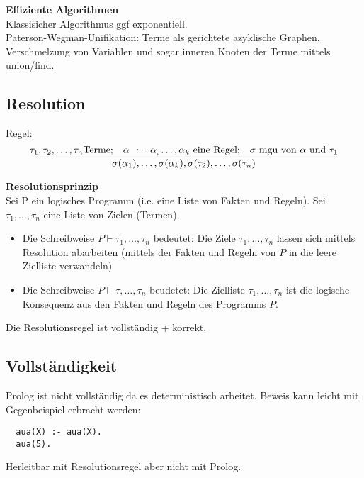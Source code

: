\textbf{Effiziente Algorithmen}\\
Klassisicher Algorithmus ggf exponentiell.\\
Paterson-Wegman-Unifikation: Terme als gerichtete azyklische Graphen.
Verschmelzung von Variablen und sogar inneren Knoten der Terme mittels union/find.

\subsection{Resolution}
Regel:
\[\frac{\tau_1, \tau_2, \ldots, \tau_n \text{Terme;}\quad \alpha \texttt{ :- } \alpha_, \ldots, \alpha_k \text{ eine Regel;}\quad \sigma \text{ mgu von } \alpha \text{ und } \tau_1}
  {\sigma(\alpha_1), \ldots, \sigma(\alpha_k), \sigma(\tau_2), \ldots, \sigma(\tau_n)}\]

\textbf{Resolutionsprinzip}\\
Sei P ein logisches Programm (i.e. eine Liste von Fakten und Regeln). Sei \(\tau_1, \ldots, \tau_n\) eine Liste von
Zielen (Termen).
\begin{itemize}
  \item Die Schreibweise \( P \vdash \tau_1, \ldots, \tau_n\) bedeutet: Die Ziele \(\tau_1, \ldots, \tau_n\) lassen sich
  mittels Resolution abarbeiten (mittels der Fakten und Regeln von \(P\) in die leere Zielliste verwandeln)
\item Die Schreibweise \( P \vDash \tau, \ldots, \tau_n \) beudetet: Die Zielliste \(\tau_1, \ldots, \tau_n\) ist die
  logische Konsequenz aus den Fakten und Regeln des Programms \(P\).
\end{itemize}
Die Resolutionsregel ist vollständig + korrekt.




\subsection{Vollständigkeit}
Prolog ist nicht vollständig da es deterministisch arbeitet. Beweis kann leicht mit Gegenbeispiel erbracht werden:
\begin{lstlisting}
  aua(X) :- aua(X).
  aua(5).
\end{lstlisting}
Herleitbar mit Resolutionsregel aber nicht mit Prolog.